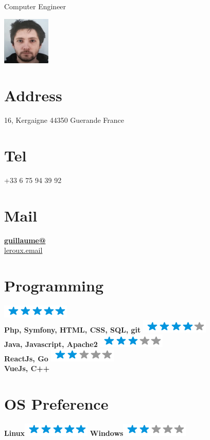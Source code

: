 \documentclass{friggeri-cv}
\begin{document}
 {}
	{Computer Engineer}


\begin{aside}
	\includegraphics[scale=1] {profil.png}
\section{Address}
	16, Kergaigne
	44350 Guerande
	France
	~
	\section{Tel}
	+33 6 75 94 39 92
	~
	\section{Mail}
	\href{mailto:guillaume@leroux.email}{\textbf{guillaume@}\\leroux.email}
	~
	\section{Programming}
	\includegraphics[scale=0.40]{img/5stars.png}\\\textbf{Php, Symfony, HTML, CSS, SQL, git}
	\includegraphics[scale=0.40]{img/4stars.png}\\\textbf{Java, Javascript, Apache2}
	\includegraphics[scale=0.40]{img/3stars.png}\\\textbf{ReactJs, Go}
	\includegraphics[scale=0.40]{img/2stars.png}\\\textbf{VueJs, C++}
	~
	\section{OS Preference}
	\textbf{Linux}\includegraphics[scale=0.40]{img/5stars.png}
	\textbf{Windows}\includegraphics[scale=0.40]{img/2stars.png}
	~

\end{aside}
\end{document}
